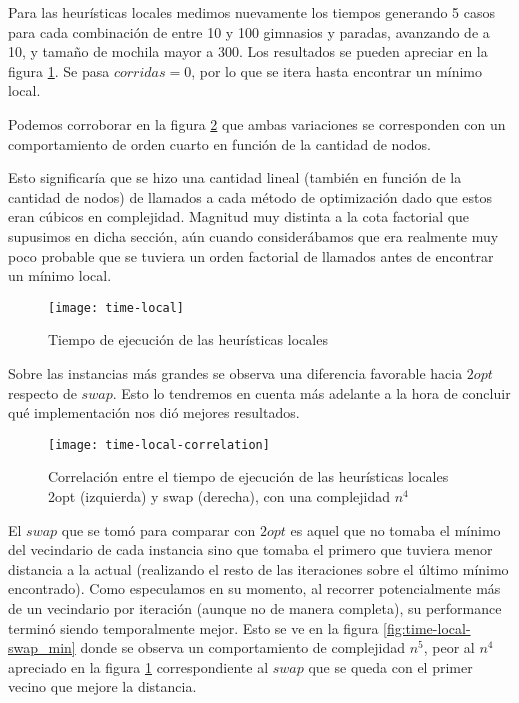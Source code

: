 Para las heurísticas locales medimos nuevamente los tiempos generando 5 casos para cada combinación de entre 10 y 100 gimnasios y paradas, avanzando de a 10, y tamaño de mochila mayor a 300. Los resultados se pueden apreciar en la figura \ref{fig:time-local}. Se pasa $corridas=0$, por lo que se itera hasta encontrar un mínimo local.

Podemos corroborar en la figura \ref{fig:time-local-correlation} que ambas variaciones se corresponden con un comportamiento de orden cuarto en función de la cantidad de nodos.

Esto significaría que se hizo una cantidad lineal (también en función de la cantidad de nodos) de llamados a cada método de optimización dado que estos eran cúbicos en complejidad. Magnitud muy distinta a la cota factorial que supusimos en dicha sección, aún cuando considerábamos que era realmente muy poco probable que se tuviera un orden factorial de llamados antes de encontrar un mínimo local.

\begin{figure}[H]
    \centering
    \texttt{[image: time-local]}
    \caption{Tiempo de ejecución de las heurísticas locales}
    \label{fig:time-local}
\end{figure}

Sobre las instancias más grandes se observa una diferencia favorable hacia $2opt$ respecto de $swap$. Esto lo tendremos en cuenta más adelante a la hora de concluir qué implementación nos dió mejores resultados.

\begin{figure}[H]
    \centering
    \texttt{[image: time-local-correlation]}
    \caption{Correlación entre el tiempo de ejecución de las heurísticas locales 2opt (izquierda) y swap (derecha), con una complejidad $n^4$}
    \label{fig:time-local-correlation}
\end{figure}

    El $swap$ que se tomó para comparar con $2opt$ es aquel que no tomaba el mínimo del vecindario de cada instancia sino que tomaba el primero que tuviera menor distancia a la actual (realizando el resto de las iteraciones sobre el último mínimo encontrado).
    Como especulamos en su momento, al recorrer potencialmente más de un vecindario por iteración (aunque no de manera completa), su performance terminó siendo temporalmente mejor. Esto se ve en la figura \ref{fig:time-local-swap_min} donde se observa un comportamiento de complejidad $n^5$, peor al $n^4$ apreciado en la figura \ref{fig:time-local} correspondiente al $swap$ que se queda con el primer vecino que mejore la distancia.

